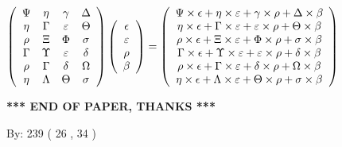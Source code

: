 \documentclass[12pt]{article}
\begin{document}
$  %
 \left( \begin{array}
 {
 c
 c
 c
 c
 }
 \Psi & 
 \eta & 
 \gamma & 
 \Delta \\ 
 \eta & 
 \Gamma & 
 \varepsilon & 
 \Theta \\ 
 \rho & 
                    \Xi & 
 \Phi & 
 \sigma \\ 
 \Gamma & 
 \Upsilon & 
 \varepsilon & 
 \delta \\ 
 \rho & 
 \Gamma & 
 \delta & 
 \Omega \\ 
 \eta & 
 \Lambda & 
 \Theta & 
 \sigma
 \end{array} \right)
 \left( \begin{array}
 {
 c
 }
 \epsilon \\ 
 \varepsilon \\ 
 \rho \\ 
 \beta
 \end{array} \right)
=
 \left( \begin{array}
 {
 c
 }
  \Psi \times  \epsilon +  \eta \times  \varepsilon +  \gamma \times  \rho +  \Delta \times  \beta \\ 
  \eta \times  \epsilon +  \Gamma \times  \varepsilon +  \varepsilon \times  \rho +  \Theta \times  \beta \\ 
  \rho \times  \epsilon +                     \Xi \times  \varepsilon +  \Phi \times  \rho +  \sigma \times  \beta \\ 
  \Gamma \times  \epsilon +  \Upsilon \times  \varepsilon +  \varepsilon \times  \rho +  \delta \times  \beta \\ 
  \rho \times  \epsilon +  \Gamma \times  \varepsilon +  \delta \times  \rho +  \Omega \times  \beta \\ 
  \eta \times  \epsilon +  \Lambda \times  \varepsilon +  \Theta \times  \rho +  \sigma \times  \beta
 \end{array} \right)
$
 
 
 
   
   
 \vspace{0.2in}
 
   
   
   
   
\vspace{1.0in} 
{\textbf{\large{ *** END OF PAPER, THANKS *** }}} 
   
   
\hspace{1.0in} By: 
         239 (          26 ,           34 )
   
   
   
   
\newpage 
\setcounter{page}{ 
    34001 } 
   
\end{document}
